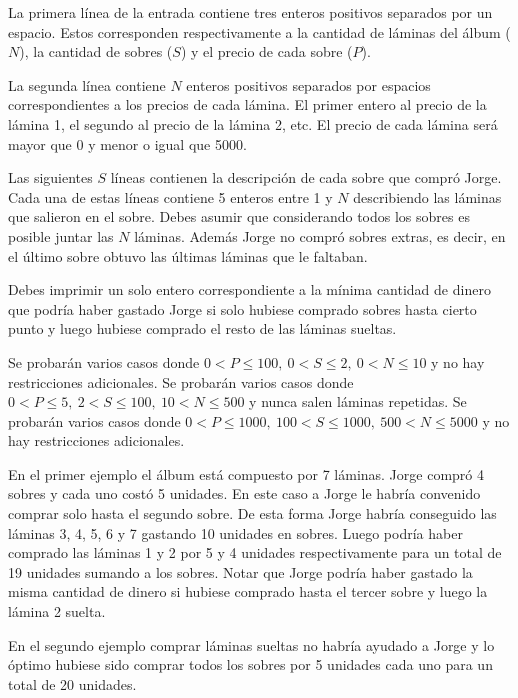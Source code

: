 \documentclass{oci}
\begin{document}
\begin{inputDescription}
La primera línea de la entrada contiene tres enteros positivos separados por un espacio.
Estos corresponden respectivamente a la cantidad de láminas del álbum ($N$), la cantidad de sobres ($S$) y el precio de cada sobre ($P$).

La segunda línea contiene $N$ enteros positivos separados por espacios correspondientes a los precios de cada lámina.
El primer entero al precio de la lámina 1, el segundo al precio de la lámina 2, etc.
El precio de cada lámina será mayor que 0 y menor o igual que 5000.

Las siguientes $S$ líneas contienen la descripción de cada sobre que compró Jorge.
Cada una de estas líneas contiene 5 enteros entre 1 y $N$ describiendo las láminas que salieron en el sobre.
Debes asumir que considerando todos los sobres es posible juntar las $N$ láminas. 
Además Jorge no compró sobres extras, es decir, en el último sobre obtuvo las últimas láminas que le faltaban.
\end{inputDescription}

\begin{outputDescription}
Debes imprimir un solo entero correspondiente a la mínima cantidad de dinero que podría haber gastado Jorge si solo hubiese comprado sobres hasta cierto punto y luego hubiese comprado el resto de las láminas sueltas.
\end{outputDescription}

\begin{scoreDescription}
   Se probarán varios casos donde
 $0 < P \leq 100,\ 0 < S \leq 2,\ 0 < N \leq 10$ y no hay restricciones adicionales.
   Se probarán varios casos donde
 $0<P\leq 5,\ 2 < S \leq 100,\ 10 < N \leq 500$ y nunca salen láminas repetidas.
   Se probarán varios casos donde
 $0<P\leq 1000,\ 100 < S \leq 1000,\ 500<N\leq 5000$ y no hay restricciones adicionales.
\end{scoreDescription}

\begin{sampleDescription}

En el primer ejemplo el álbum está compuesto por 7 láminas.
Jorge compró 4 sobres y cada uno costó 5 unidades.
En este caso a Jorge le habría convenido comprar solo hasta el segundo sobre.
De esta forma Jorge habría conseguido las láminas 3, 4, 5, 6 y 7 gastando 10 unidades en sobres.
Luego podría haber comprado las láminas 1 y 2 por 5 y 4 unidades respectivamente para un total de 19 unidades sumando a los sobres.
Notar que Jorge podría haber gastado la misma cantidad de dinero si hubiese comprado hasta el tercer sobre y luego la lámina 2 suelta.

En el segundo ejemplo comprar láminas sueltas no habría ayudado a Jorge y lo óptimo hubiese sido comprar todos los sobres por 5 unidades cada uno para un total de 20 unidades.

\end{sampleDescription}
\end{document}
